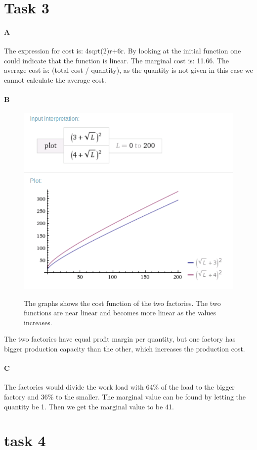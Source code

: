 \documentclass[12pt, a4paper]{article}
\begin{document}
\section{Task 3}
\paragraph{A}
The expression for cost is: 4sqrt(2)r+6r. By looking at the initial function
one could indicate that the function is linear. The marginal cost is: 11.66. The
average cost is: (total cost / quantity), as the quantity is not given in
this case we cannot calculate the average cost.

\paragraph{B}
\begin{figure}[htb]
    \centering
    \includegraphics[width=\textwidth]{plot2}
    \label{fig:plot2}
    \caption{}
The graphs shows the cost function of the two factories. The two functions are
near linear and becomes more linear as the values increases. 
\end{figure}
The two factories have equal profit margin per quantity, but one factory has
bigger production capacity than the other, which increases the production cost. 

\paragraph{C}
The factories would divide the work load with 64\% of the load to the bigger
factory and 36\% to the smaller. 
The marginal value can be found by letting the quantity be 1. Then we get the
marginal value to be 41.

\section{task 4}
\end{document}
